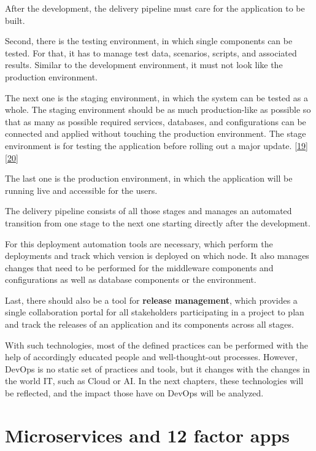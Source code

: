 \documentclass[12pt,english,a4paper,oneside,,tablecaptionabove]{scrbook}
\begin{document}
After the development, the delivery pipeline must care for the
application to be built.

Second, there is the testing environment, in which single components can
be tested. For that, it has to manage test data, scenarios, scripts, and
associated results. Similar to the development environment, it must not
look like the production environment.

The next one is the staging environment, in which the system can be
tested as a whole. The staging environment should be as much
production-like as possible so that as many as possible required
services, databases, and configurations can be connected and applied
without touching the production environment. The stage environment is
for testing the application before rolling out a major update.
{[}\protect\hyperlink{ref-MileciaMcG}{19}{]}{[}\protect\hyperlink{ref-Debbie}{20}{]}

The last one is the production environment, in which the application
will be running live and accessible for the users.

The delivery pipeline consists of all those stages and manages an
automated transition from one stage to the next one starting directly
after the development.

For this deployment automation tools are necessary, which perform the
deployments and track which version is deployed on which node. It also
manages changes that need to be performed for the middleware components
and configurations as well as database components or the environment.

Last, there should also be a tool for \textbf{release management}, which
provides a single collaboration portal for all stakeholders
participating in a project to plan and track the releases of an
application and its components across all stages.

With such technologies, most of the defined practices can be performed
with the help of accordingly educated people and well-thought-out
processes. However, DevOps is no static set of practices and tools, but
it changes with the changes in the world IT, such as Cloud or AI. In the
next chapters, these technologies will be reflected, and the impact
those have on DevOps will be analyzed.

\hypertarget{sec:ms12}{%
\section{Microservices and 12 factor apps}\label{sec:ms12}}
\end{document}
